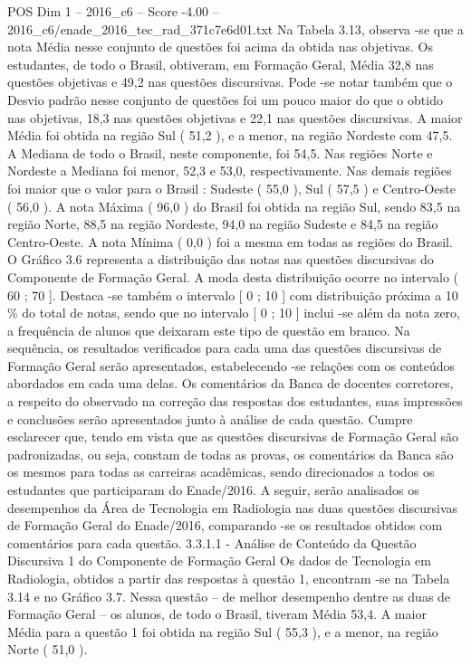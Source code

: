 \begin{textsample}{POS Dim 1 – 2016\_c6 – Score -4.00 – 2016\_c6/enade\_2016\_tec\_rad\_371c7e6d01.txt}
Na Tabela 3.13, observa -se que a nota Média nesse conjunto de questões foi acima da obtida nas objetivas.
Os estudantes, de todo o Brasil, obtiveram, em Formação Geral, Média 32,8 nas questões objetivas e 49,2 nas questões discursivas.
Pode -se notar também que o Desvio padrão nesse conjunto de questões foi um pouco maior do que o obtido nas objetivas, 18,3 nas questões objetivas e 22,1 nas questões discursivas.
A maior Média foi obtida na região Sul ( 51,2 ), e a menor, na região Nordeste com 47,5.
A Mediana de todo o Brasil, neste componente, foi 54,5.
Nas regiões Norte e Nordeste a Mediana foi menor, 52,3 e 53,0, respectivamente.
Nas demais regiões foi maior que o valor para o Brasil : Sudeste ( 55,0 ), Sul ( 57,5 ) e Centro-Oeste ( 56,0 ).
A nota Máxima ( 96,0 ) do Brasil foi obtida na região Sul, sendo 83,5 na região Norte, 88,5 na região Nordeste, 94,0 na região Sudeste e 84,5 na região Centro-Oeste.
A nota Mínima ( 0,0 ) foi a mesma em todas as regiões do Brasil.
O Gráfico 3.6 representa a distribuição das notas nas questões discursivas do Componente de Formação Geral.
A moda desta distribuição ocorre no intervalo ( 60 ; 70 ].
Destaca -se também o intervalo [ 0 ; 10 ] com distribuição próxima a 10 \% do total de notas, sendo que no intervalo [ 0 ; 10 ] inclui -se além da nota zero, a frequência de alunos que deixaram este tipo de questão em branco.
Na sequência, os resultados verificados para cada uma das questões discursivas de Formação Geral serão apresentados, estabelecendo -se relações com os conteúdos abordados em cada uma delas.
Os comentários da Banca de docentes corretores, a respeito do observado na correção das respostas dos estudantes, suas impressões e conclusões serão apresentados junto à análise de cada questão.
Cumpre esclarecer que, tendo em vista que as questões discursivas de Formação Geral são padronizadas, ou seja, constam de todas as provas, os comentários da Banca são os mesmos para todas as carreiras acadêmicas, sendo direcionados a todos os estudantes que participaram do Enade/2016.
A seguir, serão analisados os desempenhos da Área de Tecnologia em Radiologia nas duas questões discursivas de Formação Geral do Enade/2016, comparando -se os resultados obtidos com comentários para cada questão. 3.3.1.1 - Análise de Conteúdo da Questão Discursiva 1 do Componente de Formação Geral Os dados de Tecnologia em Radiologia, obtidos a partir das respostas à questão 1, encontram -se na Tabela 3.14 e no Gráfico 3.7.
Nessa questão – de melhor desempenho dentre as duas de Formação Geral – os alunos, de todo o Brasil, tiveram Média 53,4.
A maior Média para a questão 1 foi obtida na região Sul ( 55,3 ), e a menor, na região Norte ( 51,0 ).

\end{textsample}
